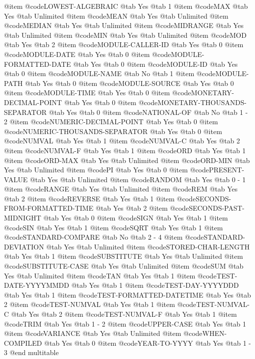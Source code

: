 @item @code{LOWEST-ALGEBRAIC} @tab Yes @tab 1
@item @code{MAX} @tab Yes @tab Unlimited
@item @code{MEAN} @tab Yes @tab Unlimited
@item @code{MEDIAN} @tab Yes @tab Unlimited
@item @code{MIDRANGE} @tab Yes @tab Unlimited
@item @code{MIN} @tab Yes @tab Unlimited
@item @code{MOD} @tab Yes @tab 2
@item @code{MODULE-CALLER-ID} @tab Yes @tab 0
@item @code{MODULE-DATE} @tab Yes @tab 0
@item @code{MODULE-FORMATTED-DATE} @tab Yes @tab 0
@item @code{MODULE-ID} @tab Yes @tab 0
@item @code{MODULE-NAME} @tab No @tab 1
@item @code{MODULE-PATH} @tab Yes @tab 0
@item @code{MODULE-SOURCE} @tab Yes @tab 0
@item @code{MODULE-TIME} @tab Yes @tab 0
@item @code{MONETARY-DECIMAL-POINT} @tab Yes @tab 0
@item @code{MONETARY-THOUSANDS-SEPARATOR} @tab Yes @tab 0
@item @code{NATIONAL-OF} @tab No @tab 1 - 2
@item @code{NUMERIC-DECIMAL-POINT} @tab Yes @tab 0
@item @code{NUMERIC-THOUSANDS-SEPARATOR} @tab Yes @tab 0
@item @code{NUMVAL} @tab Yes @tab 1
@item @code{NUMVAL-C} @tab Yes @tab 2
@item @code{NUMVAL-F} @tab Yes @tab 1
@item @code{ORD} @tab Yes @tab 1
@item @code{ORD-MAX} @tab Yes @tab Unlimited
@item @code{ORD-MIN} @tab Yes @tab Unlimited
@item @code{PI} @tab Yes @tab 0
@item @code{PRESENT-VALUE} @tab Yes @tab Unlimited
@item @code{RANDOM} @tab Yes @tab 0 - 1
@item @code{RANGE} @tab Yes @tab Unlimited
@item @code{REM} @tab Yes @tab 2
@item @code{REVERSE} @tab Yes @tab 1
@item @code{SECONDS-FROM-FORMATTED-TIME} @tab Yes @tab 2
@item @code{SECONDS-PAST-MIDNIGHT} @tab Yes @tab 0
@item @code{SIGN} @tab Yes @tab 1
@item @code{SIN} @tab Yes @tab 1
@item @code{SQRT} @tab Yes @tab 1
@item @code{STANDARD-COMPARE} @tab No @tab 2 - 4
@item @code{STANDARD-DEVIATION} @tab Yes @tab Unlimited
@item @code{STORED-CHAR-LENGTH} @tab Yes @tab 1
@item @code{SUBSTITUTE} @tab Yes @tab Unlimited
@item @code{SUBSTITUTE-CASE} @tab Yes @tab Unlimited
@item @code{SUM} @tab Yes @tab Unlimited
@item @code{TAN} @tab Yes @tab 1
@item @code{TEST-DATE-YYYYMMDD} @tab Yes @tab 1
@item @code{TEST-DAY-YYYYDDD} @tab Yes @tab 1
@item @code{TEST-FORMATTED-DATETIME} @tab Yes @tab 2
@item @code{TEST-NUMVAL} @tab Yes @tab 1
@item @code{TEST-NUMVAL-C} @tab Yes @tab 2
@item @code{TEST-NUMVAL-F} @tab Yes @tab 1
@item @code{TRIM} @tab Yes @tab 1 - 2
@item @code{UPPER-CASE} @tab Yes @tab 1
@item @code{VARIANCE} @tab Yes @tab Unlimited
@item @code{WHEN-COMPILED} @tab Yes @tab 0
@item @code{YEAR-TO-YYYY} @tab Yes @tab 1 - 3
@end multitable
